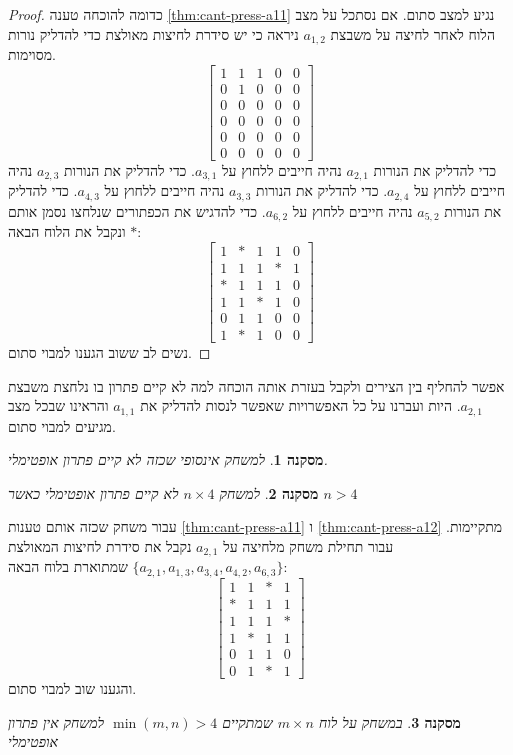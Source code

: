 \documentclass[12pt,leqno]{article}
\theoremstyle{theoremdd}
\newtheorem{corollary}{מסקנה}
\begin{document}
\begin{proof}
    כדומה להוכחה 
    טענה 
    \ref{thm:cant-press-a11}
    נגיע למצב סתום.
    אם נסתכל על מצב הלוח לאחר לחיצה על משבצת 
   $a_{1,2}$ 
   ניראה כי יש סידרת לחיצות מאולצת כדי להדליק נורות מסוימות.
   \[
        \begin{bmatrix}
            1 & 1 & 1 & 0 & 0 \\
            0 & 1 & 0 & 0 & 0 \\
            0 & 0 & 0 & 0 & 0 \\
            0 & 0 & 0 & 0 & 0 \\
            0 & 0 & 0 & 0 & 0 \\
            0 & 0 & 0 & 0 & 0
        \end{bmatrix}
    \]
    כדי להדליק את הנורות 
    $a_{2,1}$
    נהיה חייבים ללחוץ על 
    $a_{3,1}$.
    כדי להדליק את הנורות 
    $a_{2,3}$
    נהיה חייבים ללחוץ על 
    $a_{2,4}$.
    כדי להדליק את הנורות 
    $a_{3,3}$
    נהיה חייבים ללחוץ על 
    $a_{4,3}$.
    כדי להדליק את הנורות 
    $a_{5,2}$
    נהיה חייבים ללחוץ על 
    $a_{6,2}$.
    כדי להדגיש את הכפתורים שנלחצו נסמן
    אותם 
    $*$
    ונקבל את הלוח הבאה:
    \[
        \begin{bmatrix}
            1 & * & 1 & 1 & 0 \\
            1 & 1 & 1 & * & 1 \\
            * & 1 & 1 & 1 & 0 \\
            1 & 1 & * & 1 & 0 \\
            0 & 1 & 1 & 0 & 0 \\
            1 & * & 1 & 0 & 0
        \end{bmatrix}
    \]
    נשים לב ששוב הגענו למבוי סתום.
\end{proof}
אפשר להחליף בין הצירים ולקבל בעזרת אותה הוכחה 
למה לא קיים פתרון 
בו נלחצת משבצת 
$a_{2,1}$.
היות ועברנו על כל האפשרויות שאפשר 
לנסות להדליק את 
$a_{1,1}$
והראינו שבכל מצב מגיעים למבוי סתום.
\begin{corollary}
    למשחק אינסופי שכזה לא קיים פתרון אופטימלי.
\end{corollary}
\begin{corollary}
    למשחק 
    $ n \times 4$
    לא קיים פתרון אופטימלי
    כאשר 
    $n > 4$
\end{corollary}
עבור משחק שכזה
אותם 
טענות
\ref{thm:cant-press-a11}
ו
\ref{thm:cant-press-a12}
מתקיימות.
עבור 
תחילת משחק 
מלחיצה על 
$a_{2,1}$
נקבל את סידרת לחיצות המאולצת
$\{a_{2,1}, a_{1,3}, a_{3,4}, a_{4,2}, a_{6,3}\}$
שמתוארת בלוח הבאה:
\[
    \begin{bmatrix}
        1 & 1 & * & 1\\
        * & 1 & 1 & 1\\
        1 & 1 & 1 & *\\
        1 & * & 1 & 1\\
        0 & 1 & 1 & 0\\
        0 & 1 & * & 1
    \end{bmatrix}
\]
והגענו שוב למבוי סתום.
\begin{corollary}
    \label{thrm: bigger then 7x7 board no minimal solution}
    במשחק על לוח 
    $m \times n$
    שמתקיים
    $\min(m,n) > 4$
    למשחק אין פתרון אופטימלי
\end{corollary}
\end{document}
